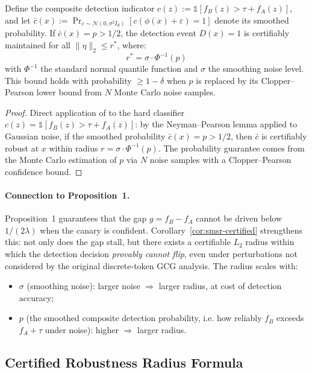 \begin{corollary}
\label{cor:smsr-certified}
Define the composite detection indicator $c(z) := \mathbb{1}[f_B(z) > \tau + f_A(z)]$, and let
$\bar{c}(x) := \Pr_{\varepsilon \sim \mathcal{N}(0, \sigma^2 I_d)}[c(\phi(x) + \varepsilon) = 1]$
denote its smoothed probability. If $\bar{c}(x) = p > 1/2$, the detection event $D(x) = 1$ is
certifiably maintained for all $\|\eta\|_2 \leq r^*$, where:
\[
r^* = \sigma \cdot \Phi^{-1}(p)
\]
with $\Phi^{-1}$ the standard normal quantile function and $\sigma$ the smoothing noise level. This
bound holds with probability $\geq 1 - \delta$ when $p$ is replaced by its Clopper--Pearson lower
bound from $N$ Monte Carlo noise samples.
\end{corollary}

\begin{proof}
Direct application of \citet{cohen2019certified} to the hard classifier $c(z) = \mathbb{1}[f_B(z) > \tau + f_A(z)]$:
by the Neyman--Pearson lemma applied to Gaussian noise, if the smoothed probability
$\bar{c}(x) = p > 1/2$, then $\bar{c}$ is certifiably robust at $x$ within radius $r = \sigma \cdot \Phi^{-1}(p)$.
The probability guarantee comes from the Monte Carlo estimation of $p$ via $N$ noise samples with a
Clopper--Pearson confidence bound.
\end{proof}

\paragraph{Connection to Proposition~1.} Proposition~1 guarantees that the gap $g = f_B - f_A$ cannot be driven below $1/(2\lambda)$ when the canary is confident. Corollary~\ref{cor:smsr-certified} strengthens this: not only does the gap stall, but there exists a certifiable $L_2$ radius within which the detection decision \emph{provably cannot flip}, even under perturbations not considered by the original discrete-token GCG analysis. The radius scales with:
\begin{itemize}
\item $\sigma$ (smoothing noise): larger noise $\Rightarrow$ larger radius, at cost of detection accuracy;
\item $p$ (the smoothed composite detection probability, i.e. how reliably $f_B$ exceeds $f_A + \tau$ under noise): higher $\Rightarrow$ larger radius.
\end{itemize}

\subsection{Certified Robustness Radius Formula}

